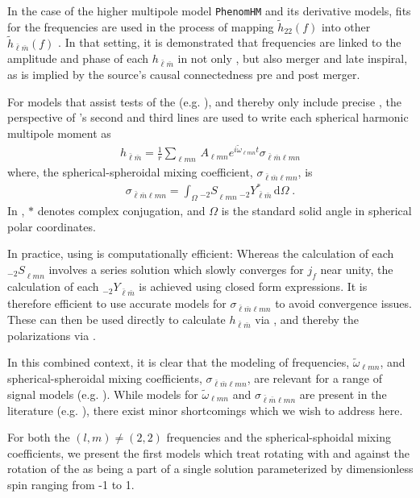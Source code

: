 \documentclass[twocolumn,aps,prd,floatfix,preprintnumbers,a4paper,nofootinbib,
superscriptaddress,10pt]{revtex4-1}
\newcommand{\cw}{\tilde{\omega}}
\def\jf{j_f}
\def\lmn{_{\ell m n}}
\def\LM{_{\bar{\ell} \bar{m}}}
\def\LMlmn{_{\bar{\ell} \bar{m} \ell m n}}
\begin{document}
%
In the case of the higher multipole model \texttt{PhenomHM} and its derivative models, fits for the \qnm{} frequencies are used in the process of mapping $\tilde{h}_{22}(f)$ into other $\tilde{h}\LM(f)$ \cite{London:2017bcn}.
%
In that setting, it is demonstrated that \qnm{} frequencies are linked to the amplitude and phase of each $h\LM$ in not only \rd{}, but also merger and late inspiral, as is implied by the source's causal connectedness pre and post merger.
%
%
\par For models that assist tests of the \nht{} (e.g. \cite{Berti:2005ys,London:2018gaq,Carullo:2018sfu}), and thereby only include precise , the perspective of 's second and third lines are used to write each spherical harmonic multipole moment as
%
\begin{align}
	\label{hlm}
	h\LM = \frac{1}{r} \sum\lmn \, A\lmn e^{i \cw\lmn t} \sigma\LMlmn
\end{align}
%
where, the spherical-spheroidal mixing coefficient, $\sigma\LMlmn$, is
%
\begin{align}
		\label{sigma}
		\sigma\LMlmn = \int_{\Omega} {_{-2}S}\lmn \,  {_{-2}}Y^*\LM \, \mathrm{d} \Omega \; .
\end{align}
%
In , $*$ denotes complex conjugation, and $\Omega$ is the standard solid angle in spherical polar coordinates.
%
\par In practice, using  is computationally efficient:
%
Whereas the calculation of each ${_{-2}S}\lmn$ involves a series solution which slowly converges for $\jf$ near unity, the calculation of each ${_{-2}Y}\LM$ is achieved using closed form expressions.
%
It is therefore efficient to use accurate models for $\sigma\LMlmn$ to avoid convergence issues. These can then be used directly to calculate $h\LM$ via , and thereby the \gw{} polarizations via .
%
%
\par In this combined context, it is clear that the modeling of \qnm{} frequencies, $\cw\lmn$, and spherical-spheroidal mixing coefficients, $\sigma\LMlmn$, are relevant for a range of \gw{} signal models (e.g. \cite{Mehta:2019wxm}).
%
While models for $\cw\lmn$ and $\sigma\LMlmn$ are present in the literature (e.g. \cite{Berti:2005ys, Berti:2014fga, Cook:2014cta}), there exist minor shortcomings which we wish to address here.
%
\par For both the $(l,m)\neq(2,2)$ \qnm{} frequencies and the spherical-sphoidal mixing coefficients, we present the first models which treat  rotating with and against the rotation of the \bh{} as being a part of a single solution parameterized by dimensionless \bh{} spin ranging from -1 to 1.
\end{document}
